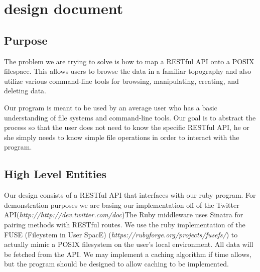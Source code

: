 \section{design document}
\subsection{Purpose}
The problem we are trying to solve is how to map a RESTful API onto a POSIX filespace. This allows users to browse the data in a familiar topography and also utilize various command-line tools for browsing, manipulating, creating, and deleting data. 

Our program is meant to be used by an average user who has a basic understanding of file systems and command-line tools. Our goal is to abstract the process so that the user does not need to know the specific RESTful API, he or she simply needs to know simple file operations in order to interact with the program.

\subsection{High Level Entities}
Our design consists of a RESTful API that interfaces with our ruby program. For demonstration purposes we are basing our implementation off of the Twitter API(\textit{http://http://dev.twitter.com/doc})The Ruby middleware uses Sinatra for pairing methods with RESTful routes. We use the ruby implementation of the FUSE (Fileystem in User SpacE) (\textit{https://rubyforge.org/projects/fusefs/}) to actually mimic a POSIX filesystem on the user's local environment. All data will be fetched from the API. We may implement a caching algorithm if time allows, but the program should be designed to allow caching to be implemented.   
